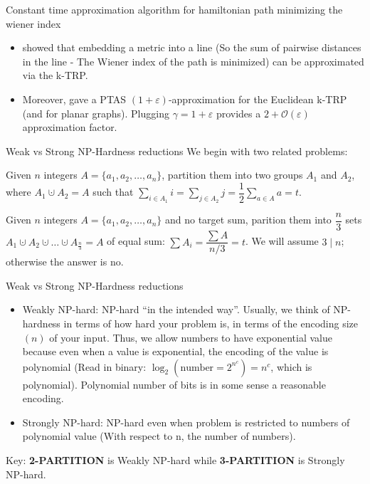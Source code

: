 \documentclass[11pt]{beamer}
\begin{document}
\begin{frame}{Constant time approximation algorithm for hamiltonian path minimizing the wiener index}
	\begin{itemize}
		\item \cite{proceeding:approx_alg_for_min_avg_distortion} showed that embedding a metric into a line (So the sum of pairwise distances in the line - The Wiener index of the path is minimized) can be approximated via the k-TRP.
		\item Moreover, \cite{article:poly_time_approx_for_trp} gave a PTAS $(1 + \varepsilon)$-approximation for the Euclidean k-TRP (and for planar graphs). Plugging $\gamma = 1 + \varepsilon$ provides a $2 + \mathcal{O}(\varepsilon)$ approximation factor.
	\end{itemize}
\end{frame}

\begin{frame}{Weak vs Strong NP-Hardness reductions}
	We begin with two related problems:
	\begin{definition}[2-PARTITION]
		Given $n$ integers $A = \{a_1, a_2, \dots, a_n\}$, partition them into two groups $A_1$ and $A_2$, where $A_1 \cupdot A_2 = A$ such that $\displaystyle\sum_{i \in A_1}i = \displaystyle\sum_{j \in A_2}j = \dfrac{1}{2}\displaystyle\sum_{a \in A}a = t$.
	\end{definition}

	\begin{definition}[3-PARTITION]
		Given $n$ integers $A = \{a_1, a_2, \dots, a_n\}$ and no target sum, parition them into $\dfrac{n}{3}$ sets $A_1 \cupdot A_2 \cupdot \dots \cupdot A_{\frac{n}{3}} = A$ of equal sum: $\displaystyle\sum A_i = \dfrac{\displaystyle\sum A}{n/3} = t$. We will assume $3\;|\;n$; otherwise the answer is no.
	\end{definition}
\end{frame}

\begin{frame}{Weak vs Strong NP-Hardness reductions}
	\begin{itemize}
		\item Weakly NP-hard: NP-hard ``in the intended way''. Usually, we think of NP-hardness in terms of how hard your problem is, in terms of the encoding size $(n)$ of your input. Thus, we allow numbers to have exponential value because even when a value is exponential, the encoding of the value is polynomial (Read in binary: $\log_2(\text{number} = 2^{n^c}) = n^c$, which is polynomial). Polynomial number of bits is in some sense a reasonable encoding.

		\item Strongly NP-hard: NP-hard even when problem is restricted to numbers of polynomial value (With respect to n, the number of numbers).
	\end{itemize}

	\vspace{0.5em}
	Key: \textbf{2-PARTITION} is Weakly NP-hard while \textbf{3-PARTITION} is Strongly NP-hard.
\end{frame}
\end{document}
